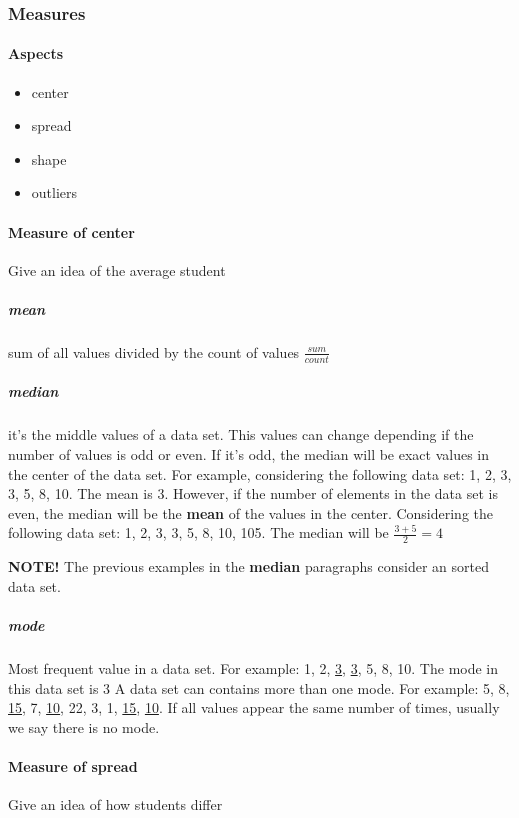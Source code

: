 \documentclass[]{article}
\begin{document}
\subsubsection{Measures}
\paragraph{Aspects}
\begin{itemize}
\item center
\item spread
\item shape
\item outliers
\end{itemize}

\paragraph{Measure of center} Give an idea of the average student
\subparagraph{mean} sum of all values divided by the count of values $ \frac{sum}{count} $
\subparagraph{median} it's the middle values of a data set. This values can change depending if the number of values is odd or even. If it's odd, the median will be exact values in the center of the data set. For example, considering the following data set: 1, 2, 3, 3, 5, 8, 10. The mean is 3. 
However, if the number of elements in the data set is even, the median will be the \textbf{mean} of the values in the center. Considering the following data set: 1, 2, 3, 3, 5, 8, 10, 105. The median will be $ \frac{3+5}{2} = 4 $

\textbf{NOTE!} The previous examples in the \textbf{median} paragraphs consider an sorted data set.
\subparagraph{mode} Most frequent value in a data set. For example: 1, 2, \underline{3}, \underline{3}, 5, 8, 10. The mode in this data set is 3
A data set can contains more than one mode. For example: 5, 8, \underline{15}, 7, \underline{10}, 22, 3, 1, \underline{15}, \underline{10}. If all values appear the same number of times, usually we say there is no mode.

\paragraph{Measure of spread} Give an idea of how students differ
\end{document}
